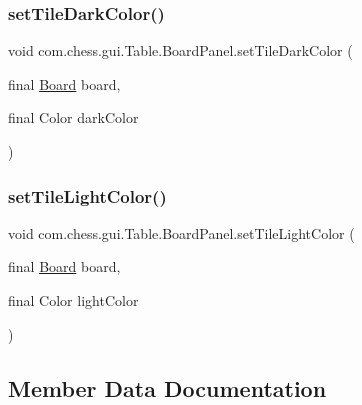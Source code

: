 \subsubsection{\texorpdfstring{setTileDarkColor()}{setTileDarkColor()}}
{\footnotesize\ttfamily void com.\+chess.\+gui.\+Table.\+Board\+Panel.\+set\+Tile\+Dark\+Color (\begin{DoxyParamCaption}\item[{final \mbox{\hyperlink{classcom_1_1chess_1_1engine_1_1classic_1_1board_1_1_board}{Board}}}]{board,  }\item[{final Color}]{dark\+Color }\end{DoxyParamCaption})\hspace{0.3cm}{\ttfamily [package]}}

\mbox{\label{classcom_1_1chess_1_1gui_1_1_table_1_1_board_panel_ac8895ee9f4e58562ae027fbd9e93f787}} 
\subsubsection{\texorpdfstring{setTileLightColor()}{setTileLightColor()}}
{\footnotesize\ttfamily void com.\+chess.\+gui.\+Table.\+Board\+Panel.\+set\+Tile\+Light\+Color (\begin{DoxyParamCaption}\item[{final \mbox{\hyperlink{classcom_1_1chess_1_1engine_1_1classic_1_1board_1_1_board}{Board}}}]{board,  }\item[{final Color}]{light\+Color }\end{DoxyParamCaption})\hspace{0.3cm}{\ttfamily [package]}}



\subsection{Member Data Documentation}
\mbox{\label{classcom_1_1chess_1_1gui_1_1_table_1_1_board_panel_aea3607737d3225a022a84e7006cb4530}} 
